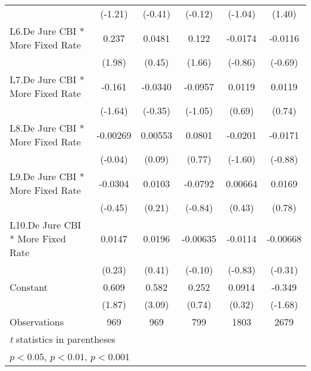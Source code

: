 {\begin{tabular}{l*{5}{c}}
                                        &  (-1.21)         &  (-0.41)         &  (-0.12)         &  (-1.04)         &   (1.40)         \\
\addlinespace
L6.De Jure CBI * More Fixed Rate        &    0.237\sym{*}  &   0.0481         &    0.122         &  -0.0174         &  -0.0116         \\
                                        &   (1.98)         &   (0.45)         &   (1.66)         &  (-0.86)         &  (-0.69)         \\
\addlinespace
L7.De Jure CBI * More Fixed Rate        &   -0.161         &  -0.0340         &  -0.0957         &   0.0119         &   0.0119         \\
                                        &  (-1.64)         &  (-0.35)         &  (-1.05)         &   (0.69)         &   (0.74)         \\
\addlinespace
L8.De Jure CBI * More Fixed Rate        & -0.00269         &  0.00553         &   0.0801         &  -0.0201         &  -0.0171         \\
                                        &  (-0.04)         &   (0.09)         &   (0.77)         &  (-1.60)         &  (-0.88)         \\
\addlinespace
L9.De Jure CBI * More Fixed Rate        &  -0.0304         &   0.0103         &  -0.0792         &  0.00664         &   0.0169         \\
                                        &  (-0.45)         &   (0.21)         &  (-0.84)         &   (0.43)         &   (0.78)         \\
\addlinespace
L10.De Jure CBI * More Fixed Rate       &   0.0147         &   0.0196         & -0.00635         &  -0.0114         & -0.00668         \\
                                        &   (0.23)         &   (0.41)         &  (-0.10)         &  (-0.83)         &  (-0.31)         \\
\addlinespace
Constant                                &    0.609         &    0.582\sym{**} &    0.252         &   0.0914         &   -0.349         \\
                                        &   (1.87)         &   (3.09)         &   (0.74)         &   (0.32)         &  (-1.68)         \\
\midrule
Observations                            &      969         &      969         &      799         &     1803         &     2679         \\
\bottomrule
\multicolumn{6}{l}{\footnotesize \textit{t} statistics in parentheses}\\
\multicolumn{6}{l}{\footnotesize \sym{*} \(p<0.05\), \sym{**} \(p<0.01\), \sym{***} \(p<0.001\)}\\
\end{tabular}
}
